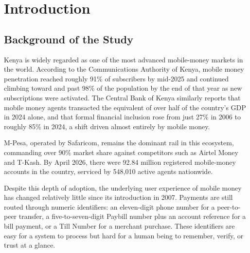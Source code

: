 \documentclass[12pt, a4paper, twoside, openright]{report}
\begin{document}
\tableofcontents
\clearpage


\listoffigures
\clearpage


\listoftables
\clearpage


\chapter{Introduction}

\section{Background of the Study}

Kenya is widely regarded as one of the most advanced mobile-money markets in the world. According to the Communications Authority of Kenya, mobile money penetration reached roughly 91\% of subscribers by mid-2025 and continued climbing toward and past 98\% of the population by the end of that year as new subscriptions were activated. The Central Bank of Kenya similarly reports that mobile money agents transacted the equivalent of over half of the country's GDP in 2024 alone, and that formal financial inclusion rose from just 27\% in 2006 to roughly 85\% in 2024, a shift driven almost entirely by mobile money.

M-Pesa, operated by Safaricom, remains the dominant rail in this ecosystem, commanding over 90\% market share against competitors such as Airtel Money and T-Kash. By April 2026, there were 92.84 million registered mobile-money accounts in the country, serviced by 548,010 active agents nationwide.

Despite this depth of adoption, the underlying user experience of mobile money has changed relatively little since its introduction in 2007. Payments are still routed through numeric identifiers: an eleven-digit phone number for a peer-to-peer transfer, a five-to-seven-digit Paybill number plus an account reference for a bill payment, or a Till Number for a merchant purchase. These identifiers are easy for a system to process but hard for a human being to remember, verify, or trust at a glance.
\end{document}
